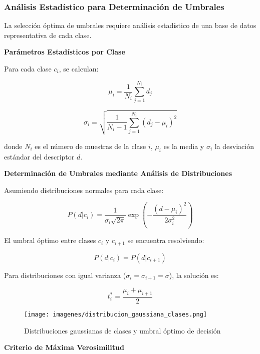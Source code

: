\subsubsection{Análisis Estadístico para Determinación de Umbrales}

La selección óptima de umbrales requiere análisis estadístico de una base de datos representativa de cada clase.

\textbf{Parámetros Estadísticos por Clase}

Para cada clase $c_i$, se calculan:

\begin{equation}
\mu_i = \frac{1}{N_i}\sum_{j=1}^{N_i} d_j
\end{equation}

\begin{equation}
\sigma_i = \sqrt{\frac{1}{N_i-1}\sum_{j=1}^{N_i}(d_j - \mu_i)^2}
\end{equation}

donde $N_i$ es el número de muestras de la clase $i$, $\mu_i$ es la media y $\sigma_i$ la desviación estándar del descriptor $d$.

\textbf{Determinación de Umbrales mediante Análisis de Distribuciones}

Asumiendo distribuciones normales para cada clase:

\begin{equation}
P(d|c_i) = \frac{1}{\sigma_i\sqrt{2\pi}} \exp\left(-\frac{(d-\mu_i)^2}{2\sigma_i^2}\right)
\end{equation}

El umbral óptimo entre clases $c_i$ y $c_{i+1}$ se encuentra resolviendo:

\begin{equation}
P(d|c_i) = P(d|c_{i+1})
\end{equation}

Para distribuciones con igual varianza ($\sigma_i = \sigma_{i+1} = \sigma$), la solución es:

\begin{equation}
t_i^* = \frac{\mu_i + \mu_{i+1}}{2}
\end{equation}

\begin{figure}[h]
\centering
\texttt{[image: imagenes/distribucion\_gaussiana\_clases.png]}
\caption{Distribuciones gaussianas de clases y umbral óptimo de decisión}
\label{fig:distribucion_clases}
\end{figure}

\textbf{Criterio de Máxima Verosimilitud}

